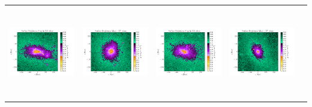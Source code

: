 \begin{tabular}{c c c c c}
 \hspace*{-1cm}\includegraphics[height=4cm,width=4cm,trim={2.5cm 1.5cm 5cm 1.5cm},clip]{../pngs/D14.png}  & 
 \hspace*{-.3cm}\includegraphics[height=4cm,width=4cm,trim={2.5cm 1.5cm 5cm 1.5cm},clip]{../pngs/D15.png}  & 
 \hspace*{-.3cm}\includegraphics[height=4cm,width=4cm,trim={2.5cm 1.5cm 5cm 1.5cm},clip]{../pngs/D16.png}  & 
 \hspace*{-.3cm}\includegraphics[height=4cm,width=4cm,trim={2.5cm 1.5cm 5cm 1.5cm},clip]{../pngs/D17.png}  &
 \\ 


\end{tabular}

